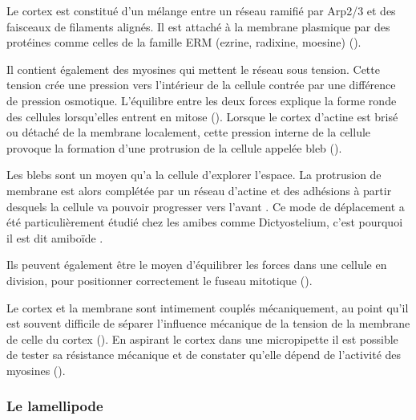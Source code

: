 Le cortex est constitué d'un mélange entre un réseau ramifié par Arp2/3 et des faisceaux de filaments alignés. 
Il est attaché à la membrane plasmique par des protéines comme celles de la famille ERM (ezrine, radixine, moesine) (\cite{biro_cell_2013}). 

Il contient également des myosines qui mettent le réseau sous tension. Cette tension crée une pression vers l'intérieur de la cellule contrée par une différence de pression osmotique. L'équilibre entre les deux forces explique la forme ronde des cellules lorsqu'elles entrent en mitose (\cite{stewart_hydrostatic_2011}).
Lorsque le cortex d'actine est brisé ou détaché de la membrane localement, cette pression interne de la cellule provoque la formation d'une protrusion de la cellule appelée bleb (\cite{paluch_cortical_2005}).

Les blebs sont un moyen qu'a la cellule d'explorer l'espace. La protrusion de membrane est alors complétée par un réseau d'actine et des adhésions à partir desquels la cellule va pouvoir progresser vers l'avant \parencite{charras_blebs_2008}. 
Ce mode de déplacement a été particulièrement étudié chez les amibes comme Dictyostelium, c'est pourquoi il est dit \og amiboïde \fg.  

Ils peuvent également être le moyen d'équilibrer les forces dans une cellule en division, pour positionner correctement le fuseau mitotique (\cite{sedzinski_polar_2011}).

Le cortex et la membrane sont intimement couplés mécaniquement, au point qu'il est souvent difficile de séparer l'influence mécanique de la tension de la membrane de celle du cortex (\cite{campillo_mechanics_2012}). 
En aspirant le cortex dans une micropipette il est possible de tester sa résistance mécanique et de constater qu'elle dépend de l'activité des myosines (\cite{bergert_cell_2012}).  



\subsubsection{Le lamellipode}

